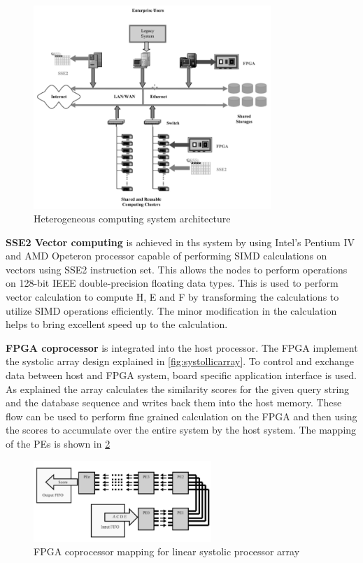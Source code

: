 \documentclass[12pt,twoside]{article}
\begin{document}
\begin{figure}[h]%
    \centering
    \includegraphics[width=0.8\textwidth]{fig/hetero}
    \caption{Heterogeneous computing system architecture \cite[Figure 1]{meng_high-performance_2010}}
    \label{fig:hetero}
\end{figure}

\textbf{SSE2 Vector computing} is achieved in ths system by using Intel's Pentium IV and AMD Opeteron processor capable of performing SIMD calculations
on vectors using SSE2 instruction set. This allows the nodes to perform operations on 128-bit IEEE double-precision floating data types. This is used 
to perform vector calculation to compute H, E and F by transforming the calculations to utilize SIMD operations efficiently. The minor modification in
the calculation helps to bring excellent speed up to the calculation.

\textbf{FPGA coprocessor} is integrated into the host processor. The FPGA implement the systolic array design explained in \cref{fig:systollicarray}.
To control and exchange data between host and FPGA system, board specific application interface is used. As explained the array calculates the 
similarity scores for the given query string and the database sequence and writes back them into the host memory. These flow can be used to
perform fine grained calculation on the FPGA and then using the scores to accumulate over the entire system by the host system. The mapping of the 
PEs is shown in \cref{fig:hetrosw}

\begin{figure}[h]%
    \centering
    \includegraphics[width=0.6\textwidth]{fig/hetrosw}
    \caption{FPGA coprocessor mapping for linear systolic processor array \cite[Figure 3]{meng_high-performance_2010}}
    \label{fig:hetrosw}
\end{figure}
\end{document}
